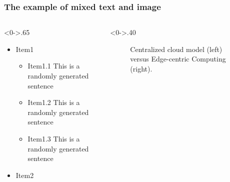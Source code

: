 \documentclass{beamer}%
\begin{document}
\begin{frame}
	\frametitle{The example of mixed text and image}
	
	\begin{columns}[T] %
		\begin{column}<0->{.65\textwidth}
			\begin{itemize}
				\item<1-> Item1
				      \begin{itemize}
					      \item<1->Item1.1 This is a randomly generated sentence
					      \item<1->Item1.2 This is a randomly generated sentence
					      \item<1->Item1.3 This is a randomly generated sentence
				      \end{itemize}
				\item<1-> Item2
			\end{itemize}
		\end{column}%
		\hfill%
		\begin{column}<0->{.40\textwidth}
			\begin{figure}[htpb]
				\centering
				\caption{Centralized cloud model (left) versus
					Edge-centric Computing (right).}
				\label{fig:edge}
			\end{figure}
		\end{column}%
	\end{columns}
\end{frame}
\end{document}

